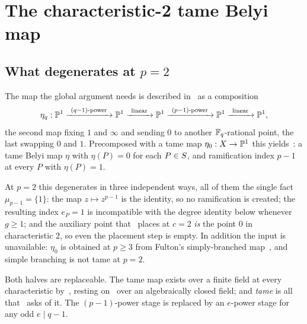 
\section{The characteristic-2 tame Belyi map}
\label{sec:tame-map}

\subsection{What degenerates at \texorpdfstring{$p = 2$}{p = 2}}
\label{sec:degeneration}

The map the global argument needs is described in~\cite[\S4.1]{kramermillerupton2021newton} as a composition
\[
  \eta_q : \PP^1 \xrightarrow{\ (q-1)\text{-power}\ } \PP^1
    \xrightarrow{\ \text{linear}\ } \PP^1
    \xrightarrow{\ (p-1)\text{-power}\ } \PP^1
    \xrightarrow{\ \text{linear}\ } \PP^1 ,
\]
the second map fixing $1$ and $\infty$ and sending $0$ to another
$\mathbb{F}_q$-rational point, the last swapping $0$ and $1$. Precomposed with a tame
map $\eta_0 : X \to \mathbb{P}^1$ this yields~\cite[Proposition 4.3]{kramermillerupton2021newton}: a tame Belyi map $\eta$ with
$\eta(P) = 0$ for each $P \in S$, and ramification index $p-1$ at every
$P$ with $\eta(P) = 1$.

At $p = 2$ this degenerates in three independent ways, all of them the
single fact $\mu_{p-1} = \{1\}$: the map $z \mapsto z^{p-1}$ is the
identity, so no ramification is created; the resulting index $e_P = 1$ is
incompatible with the degree identity below whenever $g \ge 1$; and the
auxiliary point that~\cite[Lemma 3.1]{kramermiller2021padic} places at
$c = 2$ \emph{is} the point $0$ in characteristic $2$, so even the placement
step is empty. In addition the input is unavailable: $\eta_0$ is obtained at
$p \ge 3$ from Fulton's simply-branched map~\cite{fulton1969hurwitz}, and
simple branching is not tame at $p = 2$.

Both halves are replaceable. The tame map exists over a finite field at
every characteristic by~\cite[Theorems 1.2 and
7.6]{kedlayalittwitaszek2020tame}, resting on~\cite[Theorem 1.1]{sugiyamayasuda2020belyi} over an algebraically closed
field; and \emph{tame} is all that~\cite[Theorem 4.1]{kramermillerupton2021newton} asks of it. The $(p-1)$-power stage
is replaced by an $e$-power stage for any odd $e \mid q-1$.

